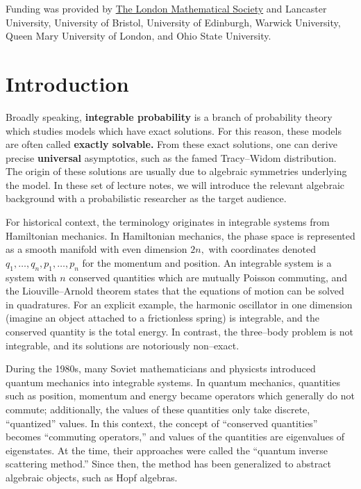 \documentclass{ximera}
\begin{document}
Funding was provided by \href{https://www.lms.ac.uk/grants/visits-uk-scheme-2}{The London Mathematical Society} and 
Lancaster University, University of Bristol, University of Edinburgh, Warwick University, Queen Mary University of London, and Ohio State University. 


\section{Introduction}

Broadly speaking, \textbf{integrable probability} is a branch of probability theory which studies 
models which have exact solutions. For this reason, these models are often called \textbf{exactly solvable.}
From these exact solutions, one can derive precise \textbf{universal} asymptotics, such as the 
famed Tracy--Widom distribution. The origin of these solutions are usually due to algebraic symmetries 
underlying the model. In these set of lecture notes, we will introduce the relevant algebraic background
with a probabilistic researcher as the target audience. 

For historical context, the terminology originates in integrable systems from Hamiltonian mechanics.
In Hamiltonian mechanics, the phase space is represented as a smooth manifold with even dimension $2n,$
with coordinates denoted $q_1,\ldots,q_n,p_1,\ldots,p_n$ for the momentum and position. An integrable
system is a system with $n$ conserved quantities which are mutually Poisson commuting, 
and the Liouville--Arnold theorem states that the equations of motion can be solved in quadratures. For an explicit example, the harmonic oscillator in 
one dimension (imagine an object attached to a frictionless spring) is integrable, and the conserved quantity
is the total energy. In contrast, the three--body problem is not integrable, and its solutions are 
notoriously non--exact. 

During the 1980s, many Soviet mathematicians and physicsts introduced quantum mechanics into integrable
systems. In quantum mechanics, quantities such as position, momentum and energy became operators which 
generally do not commute; additionally, the values of these quantities only take discrete, ``quantized''
values. In this context, the concept of ``conserved quantities'' becomes ``commuting operators,'' and 
values of the quantities are eigenvalues of eigenstates. At the time, their approaches were called the
``quantum inverse scattering method.'' Since then, the method has been generalized to abstract 
algebraic objects, such as Hopf algebras. 
\end{document}
